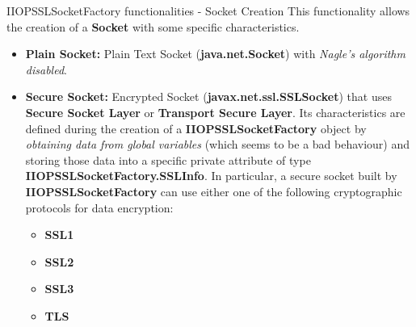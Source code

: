 \documentclass{../common/latex_classes/pdf_presentation}
\begin{document}
		\begin{frame}{IIOPSSLSocketFactory functionalities - Socket Creation}
			This functionality allows the creation of a \textbf{Socket} with some specific characteristics.
			\begin{itemize}
				\item \textbf{Plain Socket:}
				Plain Text Socket (\textbf{java.net.Socket}) with \textit{Nagle's algorithm disabled}.
				\item \textbf{Secure Socket:}
				Encrypted Socket (\textbf{javax.net.ssl.SSLSocket}) that uses \textbf{Secure Socket Layer} or \textbf{Transport Secure Layer}.
				Its characteristics are defined during the creation of a \textbf{IIOPSSLSocketFactory} object by \textit{obtaining data from global variables} (which seems to be a bad behaviour) and storing those data into a specific private attribute of type \textbf{IIOPSSLSocketFactory.SSLInfo}.
				In particular, a secure socket built by \textbf{IIOPSSLSocketFactory} can use either one of the following cryptographic protocols for data encryption:
				\begin{itemize}
					\item \textbf{SSL1} 
					\item \textbf{SSL2}
					\item \textbf{SSL3}
					\item \textbf{TLS}
				\end{itemize}
			\end{itemize}
		\end{frame}
		
\end{document}
